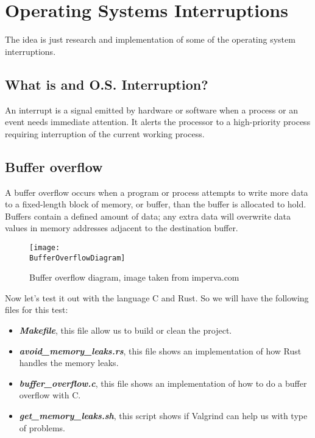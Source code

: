 \section{Operating Systems Interruptions}

The idea is just research and implementation of some of the operating system interruptions.

\subsection{What is and O.S. Interruption?}

An interrupt is a signal emitted by hardware or software when a process or an event needs immediate
attention. It alerts the processor to a high-priority process requiring interruption of the current
working process.

\subsection{Buffer overflow}

A buffer overflow occurs when a program or process attempts to write more data to a fixed-length
block of memory, or buffer, than the buffer is allocated to hold. Buffers contain a defined amount
of data; any extra data will overwrite data values in memory addresses adjacent to the destination
buffer.

\begin{figure}[h]
    \centering
    \texttt{[image: \\BufferOverflowDiagram]}
    \caption{Buffer overflow diagram, image taken from imperva.com}
\end{figure}

\vspace{0.2cm}

Now let's test it out with the language C and Rust. So we will have the following files for this
test:

\begin{itemize}
    \item \textit{\textbf{Makefile}}, this file allow us to build or clean the project.
    \item \textit{\textbf{avoid_memory_leaks.rs}},  this file shows an implementation of how Rust
    handles the memory leaks.
    \item \textit{\textbf{buffer_overflow.c}}, this file shows an implementation of how to do a
    buffer overflow with C.
    \item \textit{\textbf{get_memory_leaks.sh}}, this script shows if Valgrind can help us with type
    of problems.
\end{itemize}

